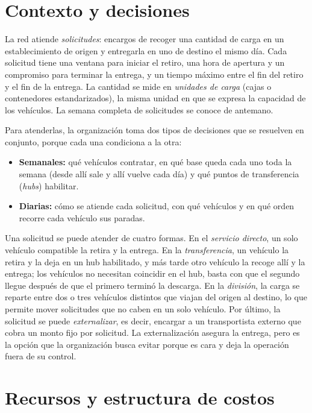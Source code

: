 \section{Contexto y decisiones}

La red atiende \emph{solicitudes}: encargos de recoger una cantidad de carga en un establecimiento de origen y entregarla en uno de destino el mismo día. Cada solicitud tiene una ventana para iniciar el retiro, una hora de apertura y un compromiso para terminar la entrega, y un tiempo máximo entre el fin del retiro y el fin de la entrega. La cantidad se mide en \emph{unidades de carga} (cajas o contenedores estandarizados), la misma unidad en que se expresa la capacidad de los vehículos. La semana completa de solicitudes se conoce de antemano.

Para atenderlas, la organización toma dos tipos de decisiones que se resuelven en conjunto, porque cada una condiciona a la otra:
\begin{itemize}\itemsep0pt
\item \textbf{Semanales:} qué vehículos contratar, en qué base queda cada uno toda la semana (desde allí sale y allí vuelve cada día) y qué puntos de transferencia (\emph{hubs}) habilitar.
\item \textbf{Diarias:} cómo se atiende cada solicitud, con qué vehículos y en qué orden recorre cada vehículo sus paradas.
\end{itemize}

Una solicitud se puede atender de cuatro formas. En el \emph{servicio directo}, un solo vehículo compatible la retira y la entrega. En la \emph{transferencia}, un vehículo la retira y la deja en un hub habilitado, y más tarde otro vehículo la recoge allí y la entrega; los vehículos no necesitan coincidir en el hub, basta con que el segundo llegue después de que el primero terminó la descarga. En la \emph{división}, la carga se reparte entre dos o tres vehículos distintos que viajan del origen al destino, lo que permite mover solicitudes que no caben en un solo vehículo. Por último, la solicitud se puede \emph{externalizar}, es decir, encargar a un transportista externo que cobra un monto fijo por solicitud. La externalización asegura la entrega, pero es la opción que la organización busca evitar porque es cara y deja la operación fuera de su control.

\section{Recursos y estructura de costos}

